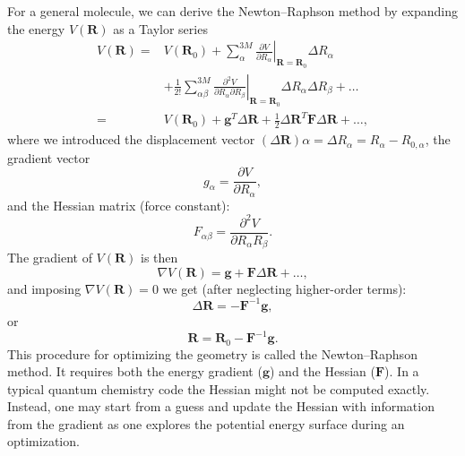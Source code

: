 \documentclass[../Main/chem532-notes.tex]{subfiles}
\begin{document}
For a general molecule, we can derive the Newton--Raphson method by expanding the energy $V(\mathbf{R})$ as a Taylor series
\begin{equation}
\begin{split}
V(\mathbf{R}) =& V(\mathbf{R}_0)
+ \sum_\alpha^{3M} \left.\frac{\partial  V}{\partial R_\alpha}\right|_{\mathbf{R} = \mathbf{R}_0} \Delta R_\alpha \\
&+ \frac{1}{2!} \sum_{\alpha\beta}^{3M}\left.\frac{\partial^2 V}{\partial R_\alpha \partial R_\beta}\right|_{\mathbf{R} = \mathbf{R}_0} \Delta R_\alpha \Delta R_\beta + \ldots \\
=& V(\mathbf{R}_0)
+ \mathbf{g}^{T} \Delta \mathbf{R} + \frac{1}{2} \Delta\mathbf{\mathbf{R}}^{T} \mathbf{F} \Delta \mathbf{R} + \ldots,
\end{split}
\end{equation}
where we introduced the displacement vector $(\Delta\mathbf{\mathbf{R}})\alpha = \Delta R_\alpha = R_\alpha - R_{0,\alpha}$, the gradient vector
\begin{equation}
g_\alpha = \frac{\partial  V}{\partial R_\alpha},
\end{equation}
and the Hessian matrix (force constant):
\begin{equation}
F_{\alpha\beta} = \frac{\partial^2 V}{\partial R_\alpha R_\beta}.
\end{equation}
The gradient of $V(\mathbf{R})$ is then
\begin{equation}
\nabla V(\mathbf{R}) = \mathbf{g} + \mathbf{F} \Delta \mathbf{R} + \ldots,
\end{equation}
and imposing $\nabla V(\mathbf{R}) = 0$ we get (after neglecting higher-order terms):
\begin{equation}
\Delta \mathbf{R} = -\mathbf{F}^{-1} \mathbf{g},
\end{equation}
or
\begin{equation}
\mathbf{R} = \mathbf{R}_0 - \mathbf{F}^{-1} \mathbf{g}.
\end{equation}
This procedure for optimizing the geometry is called the Newton--Raphson method.
It requires both the energy gradient ($\mathbf{g}$) and the Hessian ($\mathbf{F}$).
In a typical quantum chemistry code the Hessian might not be computed exactly. Instead, one may start from a guess and update the Hessian with information from the gradient as one explores the potential energy surface during an optimization.
\end{document}
